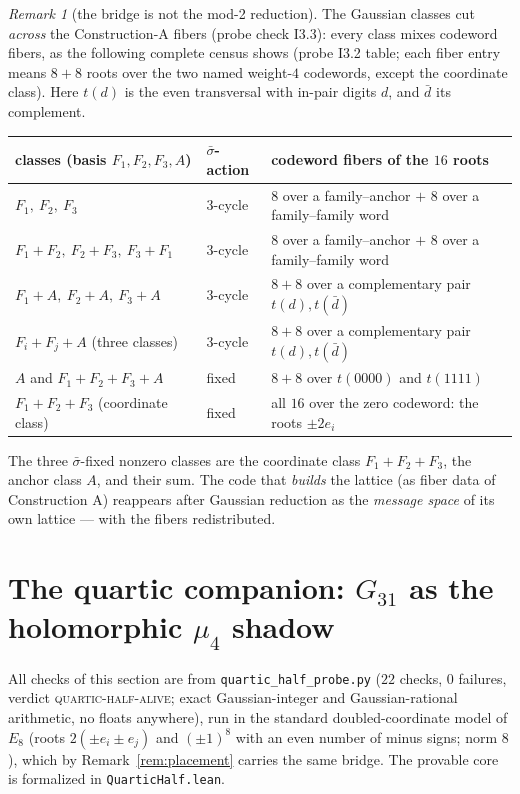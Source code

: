 \documentclass[11pt,a4paper]{article}
\theoremstyle{remark}
\newtheorem{remark}[theorem]{Remark}
\begin{document}
\begin{remark}[the bridge is not the mod-2 reduction]
\label{rem:notmod2}
The Gaussian classes cut \emph{across} the Construction-A fibers
(probe check I3.3): every class mixes codeword fibers, as the
following complete census shows (probe I3.2 table; each fiber entry
means $8+8$ roots over the two named weight-$4$ codewords, except the
coordinate class).  Here $t(d)$ is the even transversal with in-pair
digits $d$, and $\bar d$ its complement.
\begin{center}
\small
\begin{tabular}{@{}lll@{}}
\toprule
classes (basis $F_1,F_2,F_3,A$) & $\bar\sigma$-action &
codeword fibers of the $16$ roots\\
\midrule
$F_1,\ F_2,\ F_3$ & $3$-cycle &
$8$ over a family--anchor $+$ $8$ over a family--family word\\
$F_1{+}F_2,\ F_2{+}F_3,\ F_3{+}F_1$ & $3$-cycle &
$8$ over a family--anchor $+$ $8$ over a family--family word\\
$F_1{+}A,\ F_2{+}A,\ F_3{+}A$ & $3$-cycle &
$8+8$ over a complementary pair $t(d),t(\bar d)$\\
$F_i{+}F_j{+}A$ (three classes) & $3$-cycle &
$8+8$ over a complementary pair $t(d),t(\bar d)$\\
$A$ and $F_1{+}F_2{+}F_3{+}A$ & fixed &
$8+8$ over $t(0000)$ and $t(1111)$\\
$F_1{+}F_2{+}F_3$ (coordinate class) & fixed &
all $16$ over the zero codeword: the roots $\pm2e_i$\\
\bottomrule
\end{tabular}
\end{center}
The three $\bar\sigma$-fixed nonzero classes are the coordinate class
$F_1{+}F_2{+}F_3$, the anchor class $A$, and their sum.  The code
that \emph{builds} the lattice (as fiber data of Construction A)
reappears after Gaussian reduction as the \emph{message space} of its
own lattice --- with the fibers redistributed.
\end{remark}

\section{The quartic companion:
\texorpdfstring{$G_{31}$}{G31} as the holomorphic
\texorpdfstring{$\mu_4$}{mu4} shadow}\label{sec:quartic}

All checks of this section are from \texttt{quartic\_half\_probe.py}
($22$ checks, $0$ failures, verdict \textsc{quartic-half-alive};
exact Gaussian-integer and Gaussian-rational arithmetic, no floats
anywhere), run in the standard doubled-coordinate model of $E_8$
(roots $2(\pm e_i\pm e_j)$ and $(\pm1)^8$ with an even number of
minus signs; norm $8$), which by Remark~\ref{rem:placement} carries
the same bridge.  The provable core is formalized in
\texttt{QuarticHalf.lean}.
\end{document}
